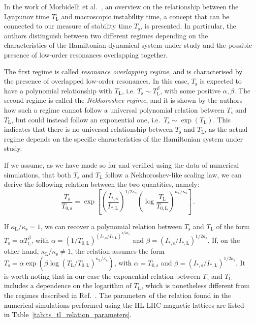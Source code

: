 In the work of Morbidelli et al.~\cite{Morbidelli1995}, an overview on the relationship between the Lyapunov time $T_\mathrm{L}$ and macroscopic instability time, a concept that can be connected to our measure of stability time $T_\mathrm{s}$, is presented. In particular, the authors distinguish between two different regimes depending on the characteristics of the Hamiltonian dynamical system under study and the possible presence of low-order resonances overlapping together.

The first regime is called \textit{resonance overlapping regime}, and is characterised by the presence of overlapped low-order resonances. In this case, $T_\mathrm{s}$ is expected to have a polynomial relationship with $T_\mathrm{L}$, i.e. $T_\mathrm{s} \sim T_\mathrm{L}^\beta$, with some positive $\alpha, \beta$. The second regime is called the \textit{Nekhoroshev regime}, and it is shown by the authors how such a regime cannot follow a universal polynomial relation between $T_\mathrm{s}$ and $T_\mathrm{L}$, but could instead follow an exponential one, i.e.\ $T_\mathrm{s} \sim \exp(T_\mathrm{L})$. This indicates that there is no universal relationship between $T_\mathrm{s}$ and $T_\mathrm{L}$, as the actual regime depends on the specific characteristics of the Hamiltonian system under study.

If we assume, as we have made so far and verified using the data of numerical simulations, that both $T_\mathrm{s}$ and $T_\mathrm{L}$ follow a Nekhoroshev-like scaling law, we can derive the following relation between the two quantities, namely:
\begin{equation}
    \frac{T_\mathrm{s}}{T_{0, \mathrm{s}}} = \exp\left[\left(\frac{I_{\ast, \mathrm{s}}}{I_{\ast, \mathrm{L}}}\right)^{1/2\kappa_\mathrm{s}}\left(\log\frac{T_\mathrm{L}}{T_{0, \mathrm{L}}}\right)^{\kappa_\mathrm{L} / \kappa_\mathrm{s}}\right] \, .
\end{equation}

If $\kappa_\mathrm{L}/\kappa_\mathrm{s} = 1$, we can recover a polynomial relation between $T_\mathrm{s}$ and $T_\mathrm{L}$ of the form $T_\mathrm{s} = \alpha T_\mathrm{L}^\beta$, with $\alpha = (1/T_{0, \mathrm{L}})^{(I_{\ast, \mathrm{s}}/I_{\ast, \mathrm{L}})^{1/2\kappa_\mathrm{s}}}$ and $\beta= (I_{\ast, \mathrm{s}}/I_{\ast, \mathrm{L}})^{1/2\kappa_\mathrm{s}}$. If, on the other hand, $\kappa_\mathrm{L}/\kappa_\mathrm{s} \neq 1$, the relation assumes the form $T_\mathrm{s} = \alpha \exp(\beta \log{\left (T_\mathrm{L}/T_{0, \mathrm{L}}\right )}^{\kappa_\mathrm{L} / \kappa_\mathrm{s}})$, with $\alpha=T_{0, \mathrm{s}}$ and $\beta=(I_{\ast, \mathrm{s}}/I_{\ast, \mathrm{L}})^{1/2\kappa_\mathrm{s}}$. It is worth noting that in our case the exponential relation between $T_\mathrm{s}$ and $T_\mathrm{L}$ includes a dependence on the logarithm of $T_\mathrm{L}$, which is nonetheless different from the regimes described in Ref.~\cite{Morbidelli1995}. The parameters of the relation found in the numerical simulations performed using the HL-LHC magnetic lattices are listed in Table~\ref{tab:ts_tl_relation_parameters}.

